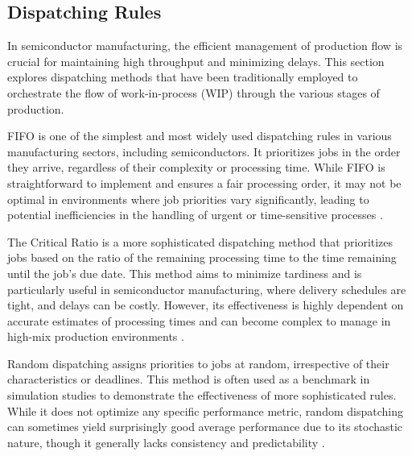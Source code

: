 \subsection{Dispatching Rules}

In semiconductor manufacturing, the efficient management of production flow is crucial for maintaining high throughput and minimizing delays. This section explores dispatching methods that have been traditionally employed to orchestrate the flow of work-in-process (WIP) through the various stages of production. 

FIFO is one of the simplest and most widely used dispatching rules in various manufacturing sectors, including semiconductors. It prioritizes jobs in the order they arrive, regardless of their complexity or processing time. While FIFO is straightforward to implement and ensures a fair processing order, it may not be optimal in environments where job priorities vary significantly, leading to potential inefficiencies in the handling of urgent or time-sensitive processes \cite{kumar1993}.

The Critical Ratio is a more sophisticated dispatching method that prioritizes jobs based on the ratio of the remaining processing time to the time remaining until the job's due date. This method aims to minimize tardiness and is particularly useful in semiconductor manufacturing, where delivery schedules are tight, and delays can be costly. However, its effectiveness is highly dependent on accurate estimates of processing times and can become complex to manage in high-mix production environments \cite{baker1974}. 

Random dispatching assigns priorities to jobs at random, irrespective of their characteristics or deadlines. This method is often used as a benchmark in simulation studies to demonstrate the effectiveness of more sophisticated rules. While it does not optimize any specific performance metric, random dispatching can sometimes yield surprisingly good average performance due to its stochastic nature, though it generally lacks consistency and predictability \cite{blackstone1982}. 

